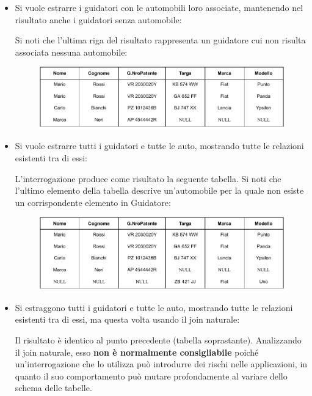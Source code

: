 \documentclass[a4paper]{article}
\begin{document}
\begin{itemize}
		\begin{itemize}
			\item Si vuole estrarre i guidatori con le automobili loro associate, mantenendo nel risultato anche i guidatori senza automobile:
			
			Si noti che l'ultima riga del risultato rappresenta un guidatore cui non risulta associata nessuna automobile:
			\begin{figure}[!htp]
				\centering
				\includegraphics[width=\textwidth]{img/join-ex2.pdf}
			\end{figure}\newpage
		
			\item Si vuole estrarre tutti i guidatori e tutte le auto, mostrando tutte le relazioni esistenti tra di essi:
			
			L'interrogazione produce come risultato la seguente tabella. Si noti che l'ultimo elemento della tabella descrive un'automobile per la quale non esiste un corrispondente elemento in \textsf{Guidatore}:
			\begin{figure}[!htp]
				\centering
				\includegraphics[width=\textwidth]{img/join-ex3.pdf}
			\end{figure}
			
			\item Si estraggono tutti i guidatori e tutte le auto, mostrando tutte le relazioni esistenti tra di essi, ma questa volta usando il join naturale:
			
			Il risultato è identico al punto precedente (tabella soprastante). Analizzando il join naturale, esso \textbf{non è normalmente consigliabile} poiché un'interrogazione che lo utilizza può introdurre dei rischi nelle applicazioni, in quanto il suo comportamento può mutare profondamente al variare dello schema delle tabelle.
		\end{itemize}
	\end{itemize}\newpage
\end{document}
